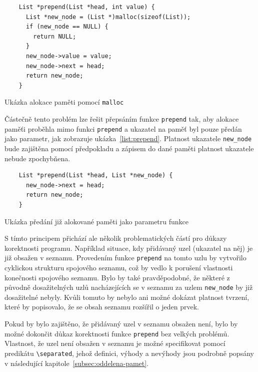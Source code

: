 \begin{listing}[H]
    \begin{verbatim}
    List *prepend(List *head, int value) {
      List *new_node = (List *)malloc(sizeof(List));
      if (new_node == NULL) {
        return NULL;
      }
      new_node->value = value;
      new_node->next = head;
      return new_node;
    }
    \end{verbatim}
    \caption{Ukázka alokace paměti pomocí \texttt{malloc}}
    \label{list:prepend-malloc}
\end{listing}

Částečně tento problém lze řešit přepsáním funkce \texttt{prepend} tak,
aby alokace paměťi proběhla mimo funkci \texttt{prepend}
a ukazatel na paměť byl pouze předán jako parametr,
jak zobrazuje ukázka~\ref{list:prepend}.
Platnost ukazatele \texttt{new\_node} bude zajištěna pomocí předpokladu
a zápisem do dané paměti platnost ukazatele nebude zpochybňena.

\begin{listing}[H]
    \begin{verbatim}
    List *prepend(List *head, List *new_node) {
      new_node->next = head;
      return new_node;
    }
    \end{verbatim}
    \caption{Ukázka předání již alokované paměti jako parametru funkce}
    \label{list:prepend}
\end{listing}

S tímto principem přichází ale několik problematických částí pro důkazy korektnosti programu.
Například situace, kdy přidávaný uzel (ukazatel na něj) je již obsažen v seznamu.
Provedením funkce \texttt{prepend} na tomto uzlu
by vytvořilo cyklickou strukturu spojového seznamu,
což by vedlo k porušení vlastnosti konečnosti spojového seznamu.
Bylo by také pravděpodobné, že některé z původně dosažitelných uzlů
nacházejících se v seznamu za uzlem \texttt{new\_node}
by již dosažitelné nebyly.
Kvůli tomuto by nebylo ani možné dokázat platnost tvrzení,
které by popisovalo, že se obsah seznamu rozšířil o jeden prvek.


Pokud by bylo zajištěno, že přidávaný uzel v seznamu obsažen není,
bylo by možné dokončit důkaz korektnosti funkce \texttt{prepend} bez velkých problémů.
Vlastnost, že uzel není obsažen v seznamu je možné specifikovat pomocí predikátu \texttt{\textbackslash separated},
jehož definici, výhody a nevýhody jsou podrobně popsány v následující kapitole~\ref{subsec:oddelena-pamet}.


